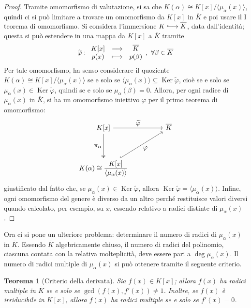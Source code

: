 \documentclass[12pt]{scrartcl}
\theoremstyle{style}
\newtheorem{teorema}{Teorema}[section]
\numberwithin{equation}{subsection}
\newcommand{\longhookrightarrow}{\lhook\joinrel\longrightarrow}
\begin{document}
\begin{proof}
	Tramite omomorfismo di valutazione, si sa che $K(\alpha ) \cong K[x] /\langle \mu _\alpha (x) \rangle$, quindi ci si pu\`o limitare a trovare un omomorfismo da $K[x]$ in $\overline{K}$ e poi usare il I teorema di omomorfismo.
	Si considera l'immersione $K \longhookrightarrow \overline{K}$, data dall'identit\`a; questa si pu\`o estendere in una mappa da $K[x]$ a $\overline{K}$ tramite 
	\[
		\widetilde{\varphi }:
		\begin{array}
			{c c c}
			K[x]& \longrightarrow &\overline{K}\\
			p(x) & \longmapsto& p(\beta)
		\end{array}, \ \forall \beta \in \overline{K}
	\] 
	Per tale omomorfismo, ha senso considerare il quoziente $K(\alpha ) \cong K[x] / \langle \mu _\alpha (x) \rangle$ se e solo se $\langle \mu _\alpha (x) \rangle\subseteq \operatorname{Ker} \widetilde{\varphi }$, cio\`e se e solo se $\mu _\alpha (x) \in \operatorname{Ker} \widetilde{\varphi }$, quindi se e solo se $\mu _\alpha (\beta ) = 0$.
	Allora, per ogni radice di $\mu _\alpha (x)$ in $\overline{K}$, si ha un omomorfismo iniettivo $\varphi $ per il primo teorema di omomorfismo:
	\[
		\begin{tikzcd}
		K[x] & &  \overline{K}\\
		\\
		K(\alpha) \cong \displaystyle \frac{K[x]}{\langle \mu _\alpha (x) \rangle}
		\arrow[from=1-1, to=1-3, "\displaystyle \widetilde{\varphi }"]
		\arrow[from=1-1, to=3-1, two heads, "\displaystyle \pi_\alpha "']
		\arrow[from=3-1, to=1-3, hook, "\displaystyle \varphi "']
		\end{tikzcd}
	\] 
	giustificato dal fatto che, se $\mu _\alpha (x) \in \operatorname{Ker} \widetilde{\varphi }$, allora $\operatorname{Ker} \widetilde{\varphi }=\langle \mu _\alpha (x) \rangle$.
	Infine, ogni omomorfismo del genere \`e diverso da un altro perch\'e restituisce valori diversi quando calcolato, per esempio, su $x$, essendo relativo a radici distinte di $\mu _\alpha (x)$.
\end{proof}
\noindent Ora ci si pone un ulteriore problema: determinare il numero di radici di $\mu _\alpha (x)$ in $\overline{K}$.
Essendo $\overline{K}$ algebricamente chiuso, il numero di radici del polinomio, ciascuna contata con la relativa molteplicit\`a, deve essere pari a $\deg \mu _\alpha (x)$.
Il numero di radici multiple di $\mu _\alpha (x)$ si pu\`o ottenere tramite il seguente criterio.
\begin{teorema}
	[Criterio della derivata]
	Sia $f(x) \in K[x]$; allora $f(x)$ ha radici multiple in $\overline{K}$ se e solo se $\operatorname{gcd}(f(x),f'(x)) \neq 1$. 
	Inoltre, se $f(x)$ \`e irriducibile in $K[x]$, allora $f(x)$ ha radici multiple se e solo se $f'(x) = 0$.
\end{teorema}
\end{document}
